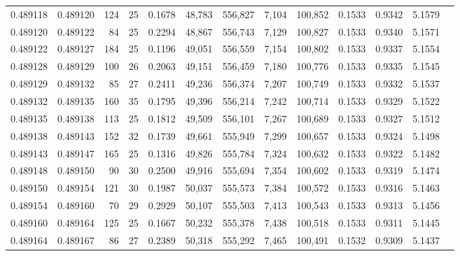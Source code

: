 \begin{tabular}{rrrrrrrrrrrrr}
0.489118 & 0.489120 & 124 &  25 &                                     0.1678 &  48,783 & 556,827 &   7,104 & 100,852 & 0.1533 & 0.9342 & 5.1579 \\
0.489120 & 0.489122 &  84 &  25 &                                     0.2294 &  48,867 & 556,743 &   7,129 & 100,827 & 0.1533 & 0.9340 & 5.1571 \\
0.489122 & 0.489127 & 184 &  25 &                                     0.1196 &  49,051 & 556,559 &   7,154 & 100,802 & 0.1533 & 0.9337 & 5.1554 \\
0.489128 & 0.489129 & 100 &  26 &                                     0.2063 &  49,151 & 556,459 &   7,180 & 100,776 & 0.1533 & 0.9335 & 5.1545 \\
0.489129 & 0.489132 &  85 &  27 &                                     0.2411 &  49,236 & 556,374 &   7,207 & 100,749 & 0.1533 & 0.9332 & 5.1537 \\
0.489132 & 0.489135 & 160 &  35 &                                     0.1795 &  49,396 & 556,214 &   7,242 & 100,714 & 0.1533 & 0.9329 & 5.1522 \\
0.489135 & 0.489138 & 113 &  25 &                                     0.1812 &  49,509 & 556,101 &   7,267 & 100,689 & 0.1533 & 0.9327 & 5.1512 \\
0.489138 & 0.489143 & 152 &  32 &                                     0.1739 &  49,661 & 555,949 &   7,299 & 100,657 & 0.1533 & 0.9324 & 5.1498 \\
0.489143 & 0.489147 & 165 &  25 &                                     0.1316 &  49,826 & 555,784 &   7,324 & 100,632 & 0.1533 & 0.9322 & 5.1482 \\
0.489148 & 0.489150 &  90 &  30 &                                     0.2500 &  49,916 & 555,694 &   7,354 & 100,602 & 0.1533 & 0.9319 & 5.1474 \\
0.489150 & 0.489154 & 121 &  30 &                                     0.1987 &  50,037 & 555,573 &   7,384 & 100,572 & 0.1533 & 0.9316 & 5.1463 \\
0.489154 & 0.489160 &  70 &  29 &                                     0.2929 &  50,107 & 555,503 &   7,413 & 100,543 & 0.1533 & 0.9313 & 5.1456 \\
0.489160 & 0.489164 & 125 &  25 &                                     0.1667 &  50,232 & 555,378 &   7,438 & 100,518 & 0.1533 & 0.9311 & 5.1445 \\
0.489164 & 0.489167 &  86 &  27 &                                     0.2389 &  50,318 & 555,292 &   7,465 & 100,491 & 0.1532 & 0.9309 & 5.1437 \\

\end{tabular}
